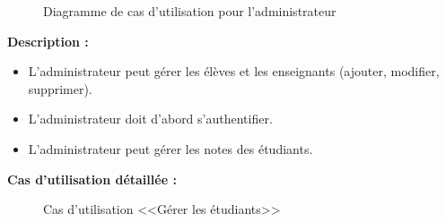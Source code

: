 \documentclass[12pt]{report}
\begin{document}
\begin{figure}[h]
\centering
  \vspace{-0.1in}
    \centerline{}
    \caption{Diagramme de cas d'utilisation pour l'administrateur}
  \vspace{-0.2in}
\end{figure}

\textbf{Description :}

\vspace{-0.1in}

\begin{itemize}
    \item L'administrateur peut gérer les élèves et les enseignants (ajouter, modifier, supprimer).
    \item L'administrateur doit d'abord s'authentifier.
    \item L'administrateur peut gérer les notes des étudiants.
  \vspace*{-0.4in}
\end{itemize}

\newpage

\textbf{Cas d'utilisation détaillée :}

\begin{figure}[h]
\centering
    \centerline{}
    \caption{Cas d'utilisation <<Gérer les étudiants>>}
\end{figure}
\end{document}
